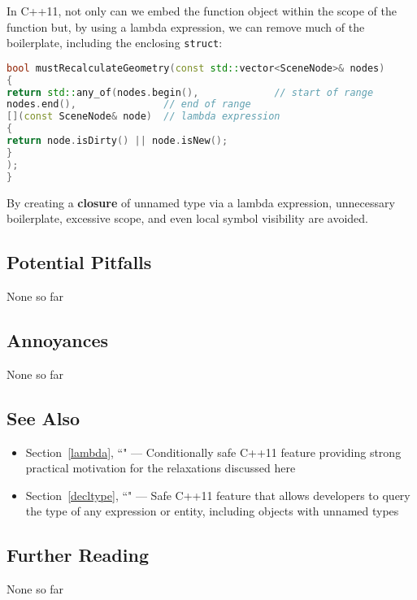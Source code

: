 \noindent In C++11, not only can we embed the function object within the scope of
the function but, by using a lambda expression, we can
remove much of the boilerplate, including the enclosing \texttt{struct}:

\begin{lstlisting}[language=C++]
bool mustRecalculateGeometry(const std::vector<SceneNode>& nodes)
{
return std::any_of(nodes.begin(),             // start of range
nodes.end(),               // end of range
[](const SceneNode& node)  // lambda expression
{
return node.isDirty() || node.isNew();
}
);
}
\end{lstlisting}

\noindent By creating a \textbf{closure} of unnamed type via a lambda
expression, unnecessary boilerplate, excessive scope, and even local
symbol visibility are avoided.

\subsection[Potential Pitfalls]{Potential Pitfalls}\label{potential-pitfalls}

None so far

\subsection[Annoyances]{Annoyances}\label{annoyances}

None so far

\subsection[See Also]{See Also}\label{see-also}

\begin{itemize}
\item{Section~\ref{lambda}, ``" — Conditionally safe C++11 feature providing strong practical motivation for the relaxations discussed here}
\item{Section~\ref{decltype}, ``" — Safe C++11 feature that allows developers to query the type of any expression or entity, including objects with unnamed types}
\end{itemize}

\subsection[Further Reading]{Further Reading}\label{further-reading}

None so far



